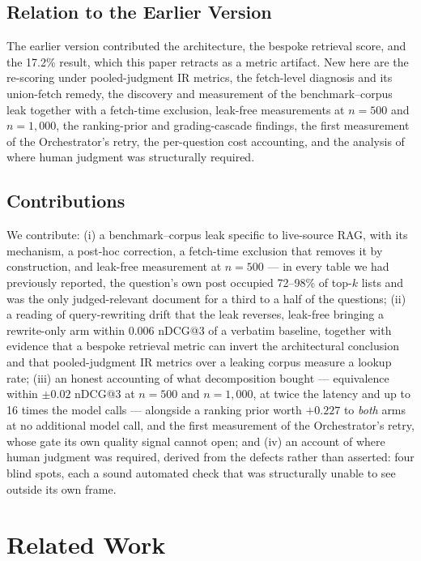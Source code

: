 \documentclass[10pt,conference]{IEEEtran}
\begin{document}
\subsection{Relation to the Earlier Version}

The earlier version contributed the architecture, the bespoke retrieval score,
and the 17.2\% result, which this paper retracts as a metric artifact. New here
are the re-scoring under pooled-judgment IR metrics, the fetch-level diagnosis and
its union-fetch remedy, the discovery and measurement of the benchmark--corpus
leak together with a fetch-time exclusion, leak-free measurements at $n=500$ and
$n=1{,}000$, the ranking-prior and grading-cascade findings, the first measurement
of the Orchestrator's retry, the per-question cost accounting, and the analysis of
where human judgment was structurally required.

\subsection{Contributions}

We contribute: (i) a benchmark--corpus leak specific to live-source RAG, with its
mechanism, a post-hoc correction, a fetch-time exclusion that removes it by
construction, and leak-free measurement at $n=500$ --- in every table we had
previously reported, the question's own post occupied 72--98\% of top-$k$ lists and
was the only judged-relevant document for a third to a half of the questions;
(ii) a reading of query-rewriting drift that the leak reverses, leak-free bringing
a rewrite-only arm within 0.006 nDCG@3 of a verbatim baseline, together with
evidence that a bespoke retrieval metric can invert the architectural conclusion
and that pooled-judgment IR metrics over a leaking corpus measure a lookup rate;
(iii) an honest accounting of what decomposition bought --- equivalence within
$\pm0.02$ nDCG@3 at $n=500$ and $n=1{,}000$, at twice the latency and up to 16
times the model calls --- alongside a ranking prior worth $+0.227$ to \emph{both}
arms at no additional model call, and the first measurement of the Orchestrator's
retry, whose gate its own quality signal cannot open; and (iv) an account of where
human judgment was required, derived from the defects rather than asserted: four
blind spots, each a sound automated check that was structurally unable to see
outside its own frame.

\section{Related Work}\label{sec:related}
\end{document}
